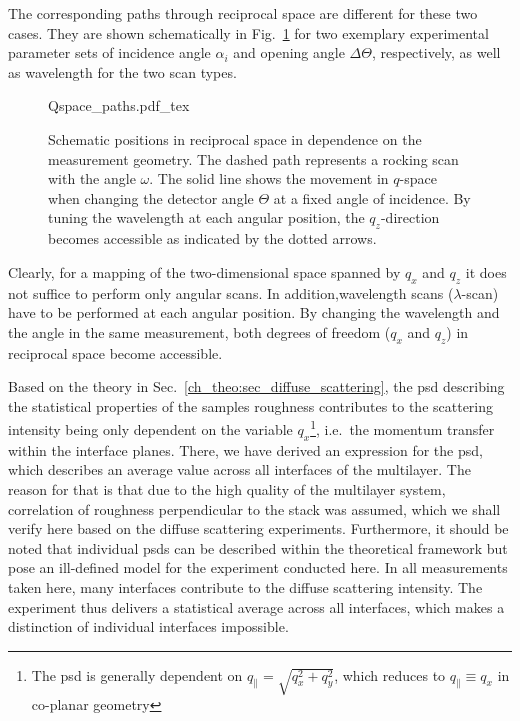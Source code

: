 The corresponding paths through reciprocal space are different for these two cases. They are shown schematically in Fig.~\ref{ch_diff:fig_pathsInQ} for two exemplary experimental parameter sets of incidence angle $\alpha_i$ and opening angle $\Delta \Theta$, respectively,  as well as wavelength for the two scan types.
\begin{figure}[htb]
    \def\svgwidth{0.7\textwidth}
    {Qspace_paths.pdf_tex}
    \caption{Schematic positions in reciprocal space in dependence on the measurement geometry. The dashed path represents a rocking scan with the angle $\omega$. The solid line shows the movement in $q$-space when changing the detector angle $\Theta$ at a fixed angle of incidence. By tuning the wavelength at each angular position, the $q_z$-direction becomes accessible as indicated by the dotted arrows.}
    \label{ch_diff:fig_pathsInQ} 
\end{figure}
Clearly, for a mapping of the two-dimensional space spanned by $q_x$ and $q_z$ it does not suffice to perform only angular scans. In addition,wavelength scans ($\lambda$-scan) have to be performed at each angular position. By changing the wavelength and the angle in the same measurement, both degrees of freedom ($q_x$ and $q_z$) in reciprocal space become accessible.

Based on the theory in Sec.~\ref{ch_theo:sec_diffuse_scattering}, the \gls{psd} describing the statistical properties of the samples roughness contributes to the scattering intensity being only dependent on the variable $q_x$\footnote{The \gls{psd} is generally dependent on $q_\parallel = \sqrt{q_x^2+q_y^2}$, which reduces to $q_\parallel \equiv q_x$ in co-planar geometry}, i.e.~the momentum transfer within the interface planes. There, we have derived an expression for the \gls{psd}, which describes an average value across all interfaces of the multilayer. The reason for that is that due to the high quality of the multilayer system, correlation of roughness perpendicular to the stack was assumed, which we shall verify here based on the diffuse scattering experiments. Furthermore, it should be noted that individual \gls{psd}s can be described within the theoretical framework but pose an ill-defined model for the experiment conducted here. In all measurements taken here, many interfaces contribute to the diffuse scattering intensity. The experiment thus delivers a statistical average across all interfaces, which makes a distinction of individual interfaces impossible.

